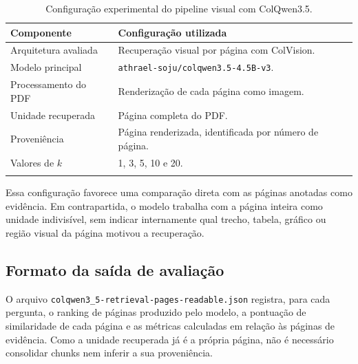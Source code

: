 \begin{table}[htbp]
\centering
\caption{Configuração experimental do pipeline visual com ColQwen3.5.}
\label{tab:config-colvision-colqwen35}
\small
\renewcommand{\arraystretch}{1.2}
\begin{tabular}{p{4.6cm}p{8.4cm}}
\toprule
\textbf{Componente} & \textbf{Configuração utilizada} \\
\midrule
Arquitetura avaliada & Recuperação visual por página com ColVision. \\
\addlinespace
Modelo principal & \texttt{athrael-soju/colqwen3.5-4.5B-v3}. \\
\addlinespace
Processamento do PDF & Renderização de cada página como imagem. \\
\addlinespace
Unidade recuperada & Página completa do PDF. \\
\addlinespace
Proveniência & Página renderizada, identificada por número de página. \\
\addlinespace
Valores de $k$ & 1, 3, 5, 10 e 20. \\
\addlinespace
\bottomrule
\end{tabular}
\end{table}

Essa configuração favorece uma comparação direta com as páginas anotadas como evidência. Em contrapartida, o modelo trabalha com a página inteira como unidade indivisível, sem indicar internamente qual trecho, tabela, gráfico ou região visual da página motivou a recuperação.

\subsection{Formato da saída de avaliação}
\label{subsec:colvision-saida-avaliacao}

O arquivo \texttt{colqwen3\_5-retrieval-pages-readable.json} registra, para cada pergunta, o ranking de páginas produzido pelo modelo, a pontuação de similaridade de cada página e as métricas calculadas em relação às páginas de evidência. Como a unidade recuperada já é a própria página, não é necessário consolidar chunks nem inferir a sua proveniência.

